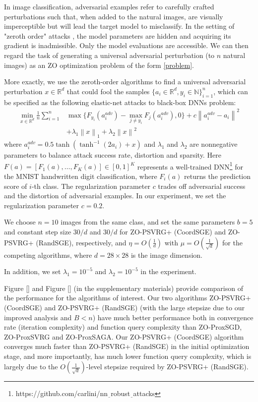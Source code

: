 \documentclass{article}
\newcommand*{\R}{\mathbb{R}}
\newcommand{\norm}[1]{\left\lVert#1\right\rVert}
\theoremstyle{definition}
\theoremstyle{remark}
\begin{document}
{\color{Brown}
In image classification, adversarial
examples refer to carefully crafted perturbations such that, when added to the natural images, are
visually imperceptible but will lead the target model to misclassify. In the setting of "zeroth order"
attacks \cite{chen2017zoo,liu2018zeroth}, the model parameters are hidden and acquiring its gradient is inadmissible. Only
the model evaluations are accessible. We can then regard the task of generating a universal adversarial
perturbation (to $n$ natural images) as an ZO optimization problem of the form \eqref{problem}.
{\color{Green}
More exactly,
we use the zeroth-order algorithms to find a universal adversarial perturbation $x\in\R^d$ that could fool the samples $\{a_i \in \R^d, y_i\in\mathbb{N} \}_{i=1}^n$, which can be specified as the following elastic-net attacks to black-box DNNs problem:
\begin{equation}
\begin{split}
\min_{x\in\R^d} \frac{1}{n} \sum_{i=1}^n& \max\{F_{y_i}(a_i^{adv}) - \max_{j\neq y_i}F_j(a_i^{adv}),0\} + c\norm{a_i^{adv} - a_i}^2 \\
&+ \lambda_1 \norm{x}_{1} + \lambda_2 \norm{x}^{2}
\end{split}
\end{equation}
where $a_i^{adv} = 0.5\tanh(\tanh^{-1}(2a_i)+x)$ and $\lambda_1$ and $\lambda_2$ are nonnegative parameters to balance attack success rate, distortion and sparsity. Here $F(a) = \left[F_1(a),\ldots,F_K(a)\right]\in [0, 1]^K$ represents a well-trained DNN{\footnote{https://github.com/carlini/nn$\underline{~~}$robust$\underline{~~}$attacks}} for the MNIST handwritten digit classification, where $F_i(a)$ returns the prediction score of $i$-th class. {\color{Brown} The regularization parameter $c$ trades off adversarial success and the distortion of adversarial examples. In our experiment, we set the regularization parameter  $c = 0.2$. }

}

We choose $n = 10$ images from the same class, and set the same
parameters $b = 5$ and constant step size {\color{red} $30/d$} and {\color{red} $30/d$} for ZO-PSVRG+ (CoordSGE) and ZO-PSVRG+ (RandSGE), respectively, and $\eta = O(\frac{1}{d})$ with $\mu = O(\frac{1}{\sqrt{d}})$ for the competing algorithms, where $d = 28 \times 28$ is the image
dimension.


{\color{Green}
In addition, we set {\color{red} $\lambda_1 = 10^{-5}$} and {\color{red} $\lambda_2 = 10^{-5}$} in the experiment.
}
}
{\color{Melon}
Figure \ref{} and Figure \ref{} (in the supplementary materials) provide
comparison of the performance for the algorithms of interest.
Our two algorithms ZO-PSVRG+ (CoordSGE) and ZO-PSVRG+ (RandSGE) (with the large stepsize due to our improved analysis and $B < n$) have much better performance
both in convergence rate (iteration complexity) and
function query complexity than ZO-ProxSGD, ZO-ProxSVRG
and ZO-ProxSAGA. Our ZO-PSVRG+ (CoordSGE)
algorithm converges much faster than ZO-PSVRG+ (RandSGE)
in the initial optimization stage, and more importantly, has
much lower function query complexity, which is largely
due to the $O(\frac{1}{\sqrt{d}})$-level stepsize required by ZO-PSVRG+ (RandSGE).
}
\end{document}
